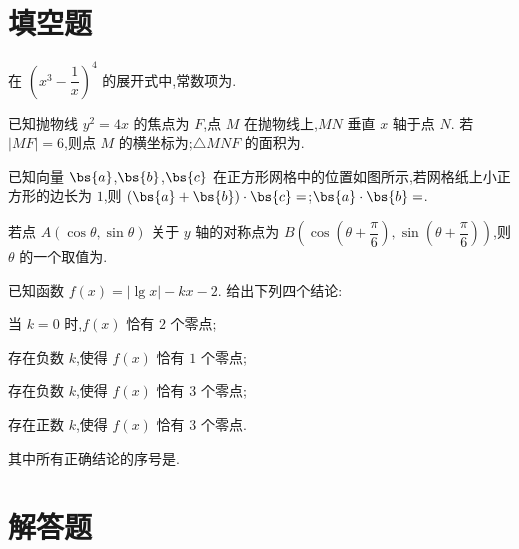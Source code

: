 \section{填空题}

\begin{problem}
在 \(\left(x^3-\dfrac{1}{x}\right)^4\) 的展开式中,常数项为\fillinblank{}.
\end{problem}

\begin{problem}
已知抛物线 \(y^2=4x\) 的焦点为 \(F\),点 \(M\) 在抛物线上,\(MN\) 垂直 \(x\) 轴于点 \(N\). 若 \(|MF|=6\),则点 \(M\) 的横坐标为\fillinblank{};\(\triangle MNF\) 的面积为\fillinblank{}.
\end{problem}

\begin{problem}
已知向量 \(\bs{a}\),\(\bs{b}\),\(\bs{c}\) 在正方形网格中的位置如图所示,若网格纸上小正方形的边长为 \(1\),则 \((\bs{a}+\bs{b})\cdot\bs{c}=\)\fillinblank{};\(\bs{a}\cdot\bs{b}=\)\fillinblank{}.

\end{problem}

\begin{problem}
若点 \(A(\cos\theta,\sin\theta)\) 关于 \(y\) 轴的对称点为 \(B\left(\cos\left(\theta+\dfrac{\pi}{6}\right),\sin\left(\theta+\dfrac{\pi}{6}\right)\right)\),则 \(\theta\) 的一个取值为\fillinblank{}.
\end{problem}

\begin{problem}
已知函数 \(f(x)=|\lg x|-kx-2\). 给出下列四个结论:

\begin{circlelist}
\item 当 \(k=0\) 时,\(f(x)\) 恰有 \(2\) 个零点;

\item 存在负数 \(k\),使得 \(f(x)\) 恰有 \(1\) 个零点;

\item 存在负数 \(k\),使得 \(f(x)\) 恰有 \(3\) 个零点;

\item 存在正数 \(k\),使得 \(f(x)\) 恰有 \(3\) 个零点.
\end{circlelist}

其中所有正确结论的序号是\fillinblank{}.
\end{problem}

\section{解答题}

